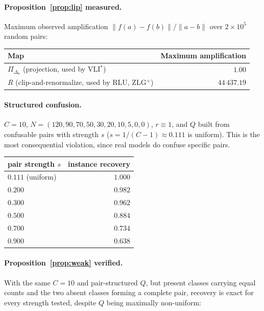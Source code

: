 \documentclass[11pt]{article}
\theoremstyle{remark}
\newcommand{\simplex}{\Delta_n}
\begin{document}
\paragraph{Proposition~\ref{prop:lip} measured.} Maximum observed
amplification $\|f(a)-f(b)\|/\|a-b\|$ over $2\times10^5$ random pairs:

\begin{center}
\begin{tabular}{lr}
\toprule
Map & Maximum amplification \\
\midrule
$\Pi_{\simplex}$ (projection, used by VLI$^*$) & $1.00$ \\
$R$ (clip-and-renormalize, used by RLU, ZLG$^+$) & $44\,437.19$ \\
\bottomrule
\end{tabular}
\end{center}

\paragraph{Structured confusion.} $C=10$,
$N=(120,90,70,50,30,20,10,5,0,0)$, $r\equiv1$, and $Q$ built from confusable
pairs with strength $s$ ($s=1/(C-1)\approx0.111$ is uniform). This is the
most consequential violation, since real models do confuse specific pairs.

\begin{center}
\begin{tabular}{lr}
\toprule
pair strength $s$ & instance recovery \\
\midrule
$0.111$ (uniform) & $1.000$ \\
$0.200$ & $0.982$ \\
$0.300$ & $0.962$ \\
$0.500$ & $0.884$ \\
$0.700$ & $0.734$ \\
$0.900$ & $0.638$ \\
\bottomrule
\end{tabular}
\end{center}

\paragraph{Proposition~\ref{prop:weak} verified.} With the same $C=10$ and
pair-structured $Q$, but present classes carrying equal counts and the two
absent classes forming a complete pair, recovery is exact for every strength
tested, despite $Q$ being maximally non-uniform:
\end{document}
